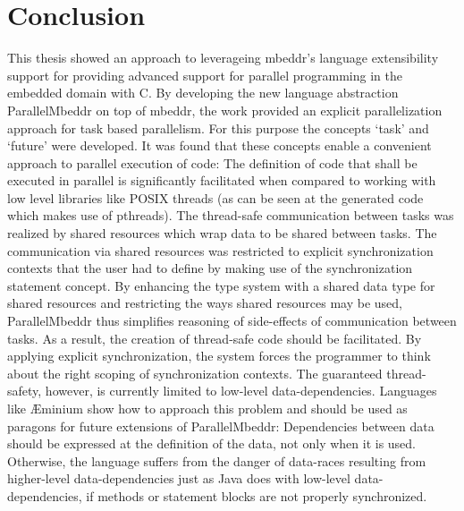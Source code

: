 \chapter{Conclusion}
\label{summary}

This thesis showed an approach to leverageing mbeddr's language extensibility support for providing advanced support for parallel programming in the embedded domain with C. By developing the new language abstraction ParallelMbeddr on top of mbeddr, the work provided an explicit parallelization approach for task based parallelism. For this purpose the concepts `task' and `future' were developed. It was found that these concepts enable a convenient approach to parallel execution of code: The definition of code that shall be executed in parallel is significantly facilitated when compared to working with low level libraries like POSIX threads (as can be seen at the generated code which makes use of pthreads). The thread-safe communication between tasks was realized by shared resources which wrap data to be shared between tasks. The communication via shared resources was restricted to explicit synchronization contexts that the user had to define by making use of the synchronization statement concept.
By enhancing the type system with a shared data type for shared resources and restricting the ways shared resources may be used, ParallelMbeddr thus simplifies reasoning of side-effects of communication between tasks. As a result, the creation of thread-safe code should be facilitated. By applying explicit synchronization, the system forces the programmer to think about the right scoping of synchronization contexts. The guaranteed thread-safety, however, is currently limited to low-level data-dependencies. Languages like \AE minium show how to approach this problem and should be used as paragons for future extensions of ParallelMbeddr: Dependencies between data should be expressed at the definition of the data, not only when it is used. Otherwise, the language suffers from the danger of data-races resulting from higher-level data-dependencies just as Java does with low-level data-dependencies, if methods or statement blocks are not properly synchronized.

